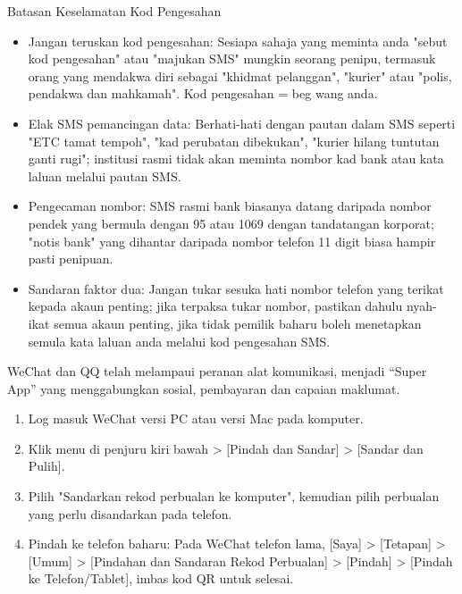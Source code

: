 \begin{tcbwarn}{Batasan Keselamatan Kod Pengesahan}
\begin{itemize}
  \item Jangan teruskan kod pengesahan: Sesiapa sahaja yang meminta anda "sebut kod pengesahan" atau "majukan SMS" mungkin seorang penipu, termasuk orang yang mendakwa diri sebagai "khidmat pelanggan", "kurier" atau "polis, pendakwa dan mahkamah". Kod pengesahan = beg wang anda.
  \item Elak SMS pemancingan data: Berhati-hati dengan pautan dalam SMS seperti "ETC tamat tempoh", "kad perubatan dibekukan", "kurier hilang tuntutan ganti rugi"; institusi rasmi tidak akan meminta nombor kad bank atau kata laluan melalui pautan SMS.
  \item Pengecaman nombor: SMS rasmi bank biasanya datang daripada nombor pendek yang bermula dengan 95 atau 1069 dengan tandatangan korporat; "notis bank" yang dihantar daripada nombor telefon 11 digit biasa hampir pasti penipuan.
  \item Sandaran faktor dua: Jangan tukar sesuka hati nombor telefon yang terikat kepada akaun penting; jika terpaksa tukar nombor, pastikan dahulu nyah-ikat semua akaun penting, jika tidak pemilik baharu boleh menetapkan semula kata laluan anda melalui kod pengesahan SMS.
\end{itemize}

\end{tcbwarn}


WeChat dan QQ telah melampaui peranan alat komunikasi, menjadi “Super App” yang menggabungkan sosial, pembayaran dan capaian maklumat.


\begin{enumerate}
  \item Log masuk WeChat versi PC atau versi Mac pada komputer.
  \item Klik menu di penjuru kiri bawah > [Pindah dan Sandar] > [Sandar dan Pulih].
  \item Pilih "Sandarkan rekod perbualan ke komputer", kemudian pilih perbualan yang perlu disandarkan pada telefon.
  \item Pindah ke telefon baharu: Pada WeChat telefon lama, [Saya] > [Tetapan] > [Umum] > [Pindahan dan Sandaran Rekod Perbualan] > [Pindah] > [Pindah ke Telefon/Tablet], imbas kod QR untuk selesai.
\end{enumerate}

